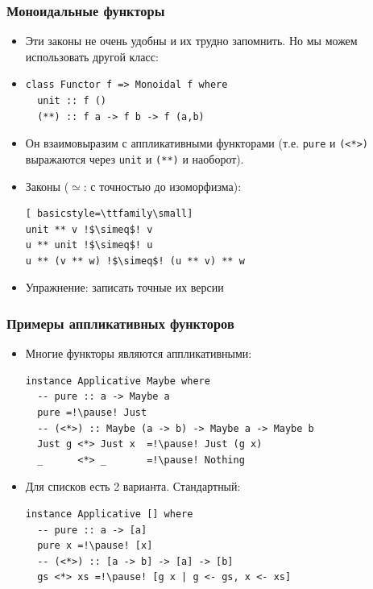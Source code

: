 \documentclass[11pt]{beamer}
\begin{document}
\begin{frame}[fragile]
  \frametitle{Моноидальные функторы}
  \begin{itemize}
    \item Эти законы не очень удобны и их трудно запомнить. Но мы можем использовать другой класс:
    \item
          \begin{lstlisting}[basicstyle=\ttfamily\small]
class Functor f => Monoidal f where
  unit :: f ()
  (**) :: f a -> f b -> f (a,b)
\end{lstlisting}
    \item Он взаимовыразим с аппликативными функторами (т.е. \lstinline|pure| и \lstinline|(<*>)| выражаются через \lstinline|unit| и \lstinline|(**)| и наоборот).
    \item Законы ($\simeq$: с точностью до изоморфизма):
          \begin{lstlisting}[ basicstyle=\ttfamily\small]
unit ** v !$\simeq$! v
u ** unit !$\simeq$! u
u ** (v ** w) !$\simeq$! (u ** v) ** w
\end{lstlisting}
    \item Упражнение: записать точные их версии
  \end{itemize}
\end{frame}

\begin{frame}[fragile]
  \frametitle{Примеры аппликативных функторов}
  \begin{itemize}
    \item Многие функторы являются аппликативными:
          \begin{lstlisting}[basicstyle=\ttfamily\small]
instance Applicative Maybe where 
  -- pure :: a -> Maybe a
  pure =!\pause! Just
  -- (<*>) :: Maybe (a -> b) -> Maybe a -> Maybe b
  Just g <*> Just x  =!\pause! Just (g x)
  _      <*> _       =!\pause! Nothing
\end{lstlisting}
          \pause
    \item Для списков есть 2 варианта. Стандартный:
          \begin{lstlisting}[basicstyle=\ttfamily\small]
instance Applicative [] where 
  -- pure :: a -> [a]
  pure x =!\pause! [x]
  -- (<*>) :: [a -> b] -> [a] -> [b]
  gs <*> xs =!\pause! [g x | g <- gs, x <- xs]
\end{lstlisting}
  \end{itemize}
\end{frame}
\end{document}

